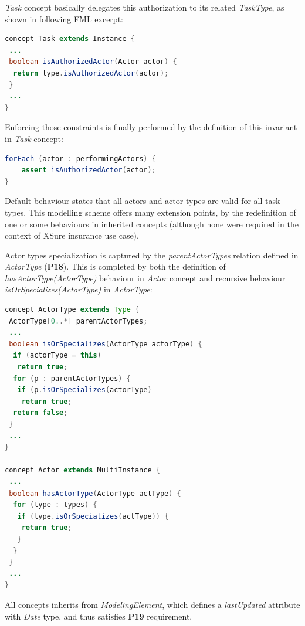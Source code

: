 \textit{Task} concept basically delegates this authorization to its related \textit{TaskType}, as shown in following FML excerpt:

\begin{lstlisting}[breaklines=true, language=java, basicstyle=\ttfamily\scriptsize, mathescape=true]
concept Task extends Instance {
 ...
 boolean isAuthorizedActor(Actor actor) {      
  return type.isAuthorizedActor(actor);      
 }  
 ...
}
\end{lstlisting}

Enforcing those constraints is finally performed by the definition of this invariant in \textit{Task} concept:

\begin{lstlisting}[breaklines=true, language=java, basicstyle=\ttfamily\scriptsize, mathescape=true]
forEach (actor : performingActors) {
    assert isAuthorizedActor(actor);
}
\end{lstlisting}

Default behaviour states that all actors and actor types are valid for all task types. This modelling scheme offers many extension points, by the redefinition of one or some behaviours in inherited concepts (although none were required in the context of XSure insurance use case).

Actor types specialization is captured by the \textit{parentActorTypes} relation defined in \textit{ActorType} (\textbf{P18}). This is completed by both the definition of \textit{hasActorType(ActorType)} behaviour in \textit{Actor} concept and recursive behaviour \textit{isOrSpecializes(ActorType)} in \textit{ActorType}:

\begin{lstlisting}[breaklines=true, language=java, basicstyle=\ttfamily\scriptsize, mathescape=true]
concept ActorType extends Type {
 ActorType[0..*] parentActorTypes;
 ...
 boolean isOrSpecializes(ActorType actorType) {    
  if (actorType = this)   
   return true;      
  for (p : parentActorTypes) {      
   if (p.isOrSpecializes(actorType)
    return true;        
  return false;    
 }
 ...
}

concept Actor extends MultiInstance {
 ...
 boolean hasActorType(ActorType actType) {      
  for (type : types) {
   if (type.isOrSpecializes(actType)) {
    return true;
   }
  }     
 }  
 ...
}
\end{lstlisting}

All concepts inherits from \textit{ModelingElement}, which defines a \textit{lastUpdated} attribute with \textit{Date} type, and thus satisfies \textbf{P19} requirement. 


